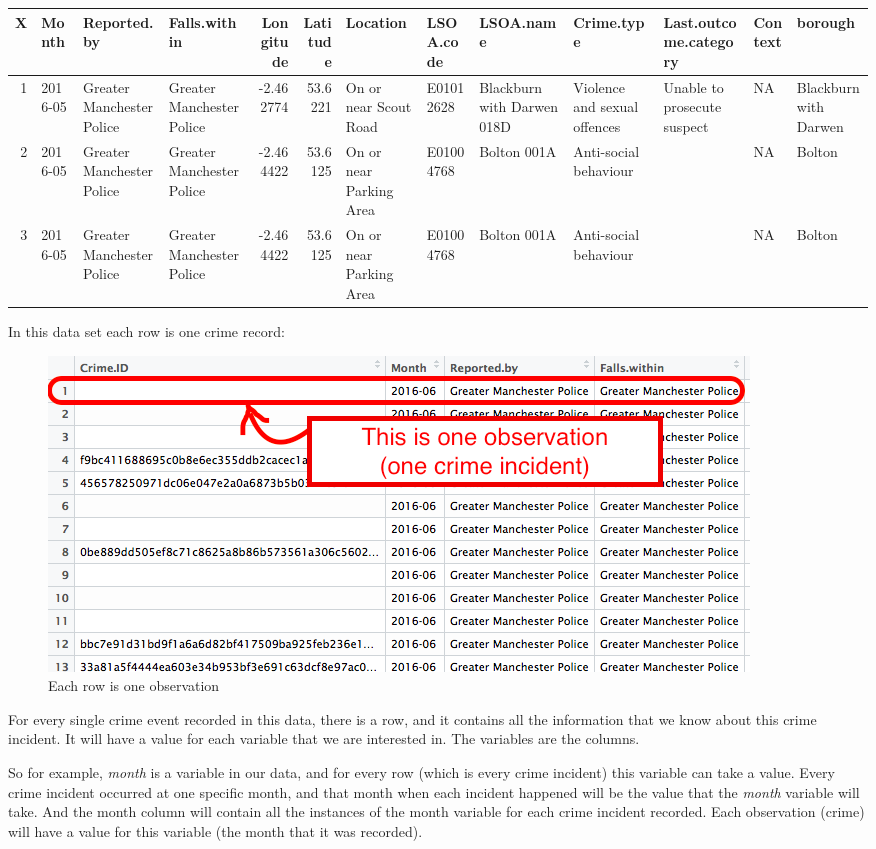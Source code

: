 \documentclass[]{book}
\theoremstyle{definition}
\theoremstyle{definition}
\theoremstyle{definition}
\theoremstyle{remark}
\begin{document}
\begin{tabular}{r|l|l|l|r|r|l|l|l|l|l|l|l}
\hline
X & Month & Reported.by & Falls.within & Longitude & Latitude & Location & LSOA.code & LSOA.name & Crime.type & Last.outcome.category & Context & borough\\
\hline
1 & 2016-05 & Greater Manchester Police & Greater Manchester Police & -2.462774 & 53.6221 & On or near Scout Road & E01012628 & Blackburn with Darwen 018D & Violence and sexual offences & Unable to prosecute suspect & NA & Blackburn with Darwen\\
\hline
2 & 2016-05 & Greater Manchester Police & Greater Manchester Police & -2.464422 & 53.6125 & On or near Parking Area & E01004768 & Bolton 001A & Anti-social behaviour &  & NA & Bolton\\
\hline
3 & 2016-05 & Greater Manchester Police & Greater Manchester Police & -2.464422 & 53.6125 & On or near Parking Area & E01004768 & Bolton 001A & Anti-social behaviour &  & NA & Bolton\\
\hline
\end{tabular}

In this data set each row is one crime record:

\begin{figure}
\centering
\includegraphics{imgs/rowIsObservation.png}
\caption{Each row is one observation}
\end{figure}

For every single crime event recorded in this data, there is a row, and
it contains all the information that we know about this crime incident.
It will have a value for each variable that we are interested in. The
variables are the columns.

So for example, \emph{month} is a variable in our data, and for every
row (which is every crime incident) this variable can take a value.
Every crime incident occurred at one specific month, and that month when
each incident happened will be the value that the \emph{month} variable
will take. And the month column will contain all the instances of the
month variable for each crime incident recorded. Each observation
(crime) will have a value for this variable (the month that it was
recorded).
\end{document}
